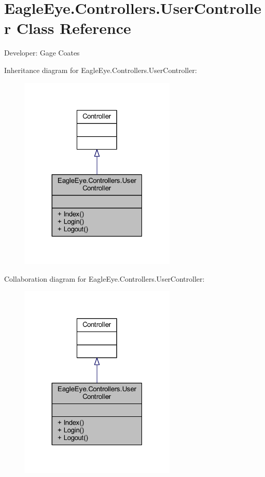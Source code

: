 \hypertarget{class_eagle_eye_1_1_controllers_1_1_user_controller}{}\section{Eagle\+Eye.\+Controllers.\+User\+Controller Class Reference}
\label{class_eagle_eye_1_1_controllers_1_1_user_controller}


Developer\+: Gage Coates  




Inheritance diagram for Eagle\+Eye.\+Controllers.\+User\+Controller\+:\nopagebreak
\begin{figure}[H]
\begin{center}
\leavevmode
\includegraphics[width=211pt]{class_eagle_eye_1_1_controllers_1_1_user_controller__inherit__graph}
\end{center}
\end{figure}


Collaboration diagram for Eagle\+Eye.\+Controllers.\+User\+Controller\+:\nopagebreak
\begin{figure}[H]
\begin{center}
\leavevmode
\includegraphics[width=211pt]{class_eagle_eye_1_1_controllers_1_1_user_controller__coll__graph}
\end{center}
\end{figure}
